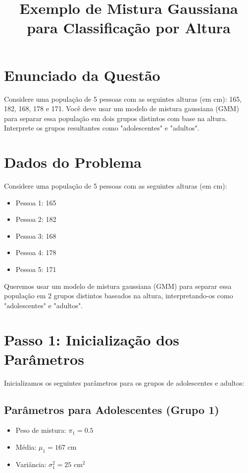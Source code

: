 \documentclass{article}
\title{Exemplo de Mistura Gaussiana para Classificação por Altura}
\author{}
\date{}
\begin{document}
\maketitle

\section*{Enunciado da Questão}
Considere uma população de 5 pessoas com as seguintes alturas (em cm): 165, 182, 168, 178 e 171. Você deve usar um modelo de mistura gaussiana (GMM) para separar essa população em dois grupos distintos com base na altura. Interprete os grupos resultantes como "adolescentes" e "adultos".

\section{Dados do Problema}
Considere uma população de 5 pessoas com as seguintes alturas (em cm):
\begin{itemize}
    \item Pessoa 1: 165
    \item Pessoa 2: 182
    \item Pessoa 3: 168
    \item Pessoa 4: 178
    \item Pessoa 5: 171
\end{itemize}

Queremos usar um modelo de mistura gaussiana (GMM) para separar essa população em 2 grupos distintos baseados na altura, interpretando-os como "adolescentes" e "adultos".

\section{Passo 1: Inicialização dos Parâmetros}
Inicializamos os seguintes parâmetros para os grupos de adolescentes e adultos:

\subsection{Parâmetros para Adolescentes (Grupo 1)}
\begin{itemize}
    \item Peso de mistura: $\pi_1 = 0.5$
    \item Média: $\mu_1 = 167$ cm
    \item Variância: $\sigma_1^2 = 25$ cm$^2$
\end{itemize}
\end{document}
